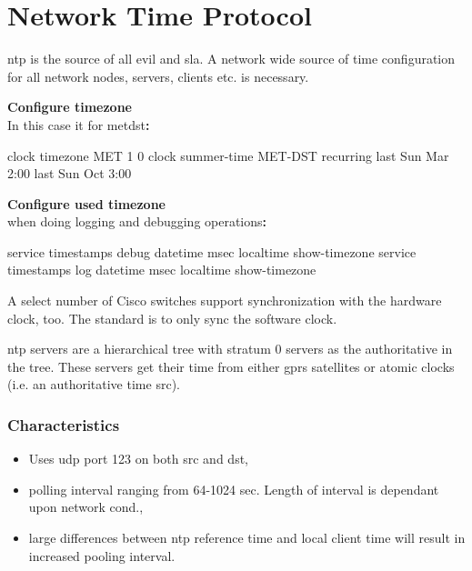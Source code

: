 
\chapter[NTP]{Network Time Protocol}

\gls{ntp} is the source of all evil and \gls{sla}. A network wide source of time configuration for all network nodes, servers, clients etc. is necessary.

\textbf{Configure timezone}\\In this case it for \gls{metdst}\textbf{:}

\begin{txt}
clock timezone MET 1 0
clock summer-time MET-DST recurring last Sun Mar 2:00 last Sun Oct 3:00
\end{txt}

\textbf{Configure used timezone}\\when doing logging and debugging operations\textbf{:}

\begin{txt}
service timestamps debug datetime msec localtime show-timezone
service timestamps log datetime msec localtime show-timezone
\end{txt}

A select number of Cisco switches support synchronization with the hardware clock, too. The standard is to only sync the software clock.\\


\gls{ntp} servers are a hierarchical tree with stratum 0 servers as the authoritative in the tree. These servers get their time from either \gls{gprs} satellites or atomic clocks {\footnotesize (i.e. an authoritative time \gls{src})}.

\subsection{Characteristics}

\begin{itemize}
	\item Uses \gls{udp} port 123 on both \gls{src} and \gls{dst},
	\item polling interval ranging from 64-1024 sec. Length of interval is dependant upon network cond.,
	\item large differences between \gls{ntp} reference time and local client time will result in increased pooling interval.
\end{itemize}

